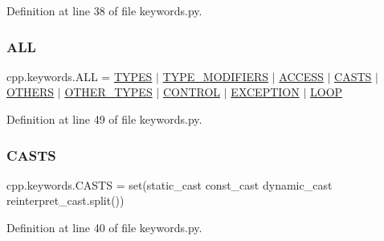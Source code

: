 Definition at line 38 of file keywords.\+py.

\mbox{\label{namespacecpp_1_1keywords_a2e8727b78fb9434c99ac8518c6dd1ecc}} 
\subsubsection{\texorpdfstring{A\+LL}{ALL}}
{\footnotesize\ttfamily cpp.\+keywords.\+A\+LL = \hyperlink{namespacecpp_1_1keywords_a56fd5baf357970548e1ec366edfc2c13}{T\+Y\+P\+ES} $\vert$ \hyperlink{namespacecpp_1_1keywords_af9282ce418d6b4b43dca5ed574caedd7}{T\+Y\+P\+E\+\_\+\+M\+O\+D\+I\+F\+I\+E\+RS} $\vert$ \hyperlink{namespacecpp_1_1keywords_a786f41bbea982641425c819d10bb2064}{A\+C\+C\+E\+SS} $\vert$ \hyperlink{namespacecpp_1_1keywords_aeba38dc38e188040f4ec44ba05092e7f}{C\+A\+S\+TS} $\vert$ \hyperlink{namespacecpp_1_1keywords_a15fe231fbad145538b73892804898809}{O\+T\+H\+E\+RS} $\vert$ \hyperlink{namespacecpp_1_1keywords_aa86a5e35a3ace14022a5ca1b91baf207}{O\+T\+H\+E\+R\+\_\+\+T\+Y\+P\+ES} $\vert$ \hyperlink{namespacecpp_1_1keywords_a374dfe9c96681079802ba4724287b8ff}{C\+O\+N\+T\+R\+OL} $\vert$ \hyperlink{namespacecpp_1_1keywords_a2665fb8a25a4dae03fa5d3dc975c537c}{E\+X\+C\+E\+P\+T\+I\+ON} $\vert$ \hyperlink{namespacecpp_1_1keywords_af0164c05398a2291487b76414102d555}{L\+O\+OP}}



Definition at line 49 of file keywords.\+py.

\mbox{\label{namespacecpp_1_1keywords_aeba38dc38e188040f4ec44ba05092e7f}} 
\subsubsection{\texorpdfstring{C\+A\+S\+TS}{CASTS}}
{\footnotesize\ttfamily cpp.\+keywords.\+C\+A\+S\+TS = set(\textquotesingle{}static\+\_\+cast const\+\_\+cast dynamic\+\_\+cast reinterpret\+\_\+cast\textquotesingle{}.split())}



Definition at line 40 of file keywords.\+py.

\mbox{\label{namespacecpp_1_1keywords_a374dfe9c96681079802ba4724287b8ff}} 
